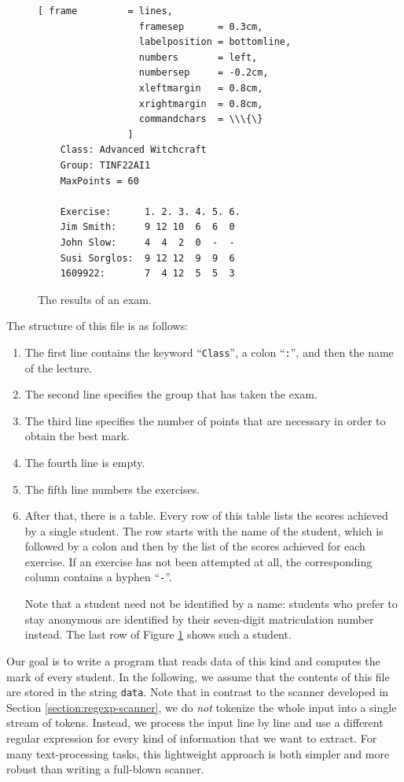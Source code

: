 \begin{figure}[!h]
\centering
\begin{Verbatim}[ frame         = lines, 
                  framesep      = 0.3cm, 
                  labelposition = bottomline,
                  numbers       = left,
                  numbersep     = -0.2cm,
                  xleftmargin   = 0.8cm,
                  xrightmargin  = 0.8cm,
                  commandchars  = \\\{\}
                ]
    Class: Advanced Witchcraft
    Group: TINF22AI1
    MaxPoints = 60
   
    Exercise:      1. 2. 3. 4. 5. 6.
    Jim Smith:     9 12 10  6  6  0
    John Slow:     4  4  2  0  -  -
    Susi Sorglos:  9 12 12  9  9  6
    1609922:       7  4 12  5  5  3
\end{Verbatim}
\vspace*{-0.3cm}
\caption{The results of an exam.}
\label{fig:result.txt}
\end{figure}

\noindent
The structure of this file is as follows:
\begin{enumerate}
\item The first line contains the keyword ``\texttt{Class}'', a colon ``\texttt{:}'', and then the name of the
      lecture.
\item The second line specifies the group that has taken the exam.
\item The third line specifies the number of points that are necessary in order to obtain the best mark.
\item The fourth line is empty.
\item The fifth line numbers the exercises.
\item After that, there is a table.  Every row of this table lists the scores achieved by a single student.  The
      row starts with the name of the student, which is followed by a colon and then by the list of the scores
      achieved for each exercise.  If an exercise has not been attempted at all, the corresponding column
      contains a hyphen ``\texttt{-}''.

      Note that a student need not be identified by a name: students who prefer to stay anonymous are identified
      by their seven-digit matriculation number instead.  The last row of Figure \ref{fig:result.txt} shows such
      a student.
\end{enumerate}
Our goal is to write a program that reads data of this kind and computes the mark of every student.  In the
following, we assume that the contents of this file are stored in the string \texttt{data}.  Note that in
contrast to the scanner developed in Section \ref{section:regexp-scanner}, we do \emph{not} tokenize the whole input
into a single stream of tokens.  Instead, we process the input line by line and use a different regular
expression for every kind of information that we want to extract.  For many text-processing tasks, this
lightweight approach is both simpler and more robust than writing a full-blown scanner.

